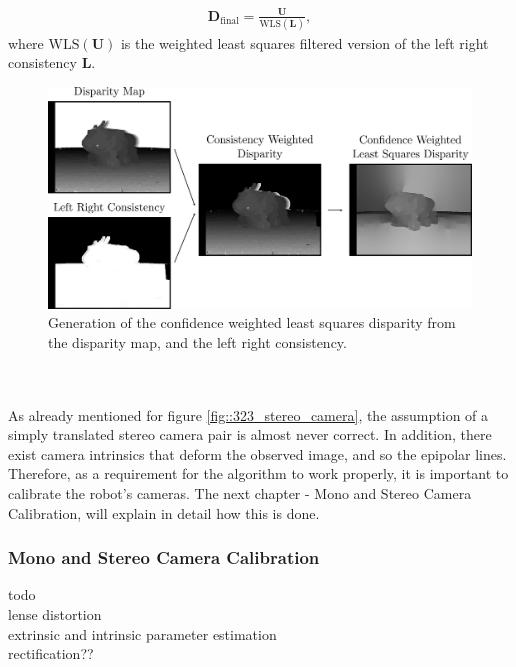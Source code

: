 \begin{align}
	\bm{D}_\text{final} = \frac{\bm{U}}{\text{WLS}(\bm{L})},
\end{align}
where $\text{WLS}(\bm{U})$ is the weighted least squares filtered version of the left right consistency $\bm{L}$.
\begin{figure}[h]
	\centering
	\includegraphics[scale=.28]{chapters/03_background/img/weighted_least_squares_disparity.png}
	\caption{Generation of the confidence weighted least squares disparity from the disparity map, and the left right consistency.}
	\label{fig::323_weighted_least_squares_disparity}
\end{figure}
\\\\
As already mentioned for figure \ref{fig::323_stereo_camera}, the assumption of a simply translated stereo camera pair is almost never correct. In addition, there exist camera intrinsics that deform the observed image, and so the epipolar lines. Therefore, as a requirement for the algorithm to work properly, it is important to calibrate the robot's cameras. The next chapter - Mono and Stereo Camera Calibration, will explain in detail how this is done.
\subsubsection{Mono and Stereo Camera Calibration}
todo \\
\cite{duane1971close} lense distortion\\
\cite{zhang2000flexible} extrinsic and intrinsic parameter estimation \\
\cite{loop1999computing} rectification??\\